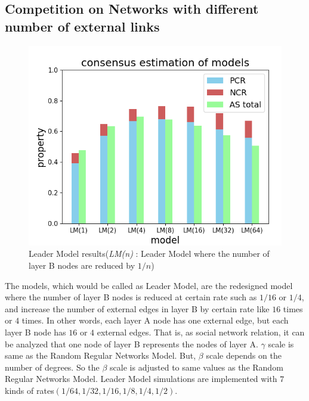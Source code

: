 \documentclass[english]{cccconf}
\begin{document}
\subsection{Competition on Networks with different number of external links}
\begin{figure}[!htb]
	\centering
	\includegraphics[width=\hsize]{FIG5.png}
	\caption{Leader Model results(\textit{LM(n)} : Leader Model where the number of layer B nodes are reduced by $1/n$)}
	\label{Fig5}
\end{figure}
The models, which would be called as Leader Model, are the redesigned model where the number of layer B nodes is reduced at certain rate such as $1/16$ or $1/4$, and increase the number of external edges in layer B by certain rate like $16$ times or $4$ times. In other words, each layer A node has one external edge, but each layer B node has $16$ or $4$ external edges. That is, as social network relation, it can be analyzed that one node of layer B represents the nodes of layer A. $\gamma$ scale is same as the Random Regular Networks Model. But, $\beta$ scale depends on the number of degrees. So the $\beta$ scale is adjusted to same values as the Random Regular Networks Model. Leader Model simulations are implemented with $7$ kinds of rates$(1/64, 1/32, 1/16, 1/8, 1/4, 1/2)$. 
\end{document}
